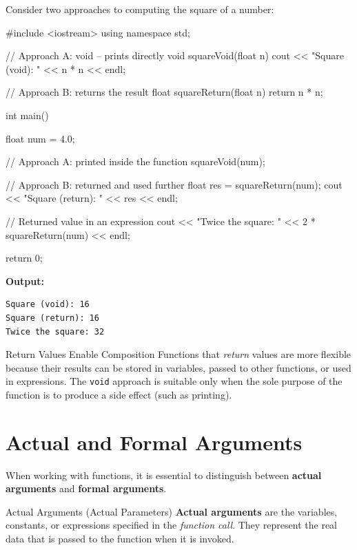 Consider two approaches to computing the square of a number:

\begin{cppcode}
#include <iostream>
using namespace std;

// Approach A: void -- prints directly
void squareVoid(float n)
{
    cout << "Square (void): " << n * n << endl;
}

// Approach B: returns the result
float squareReturn(float n)
{
    return n * n;
}

int main()
{
    float num = 4.0;

    // Approach A: printed inside the function
    squareVoid(num);

    // Approach B: returned and used further
    float res = squareReturn(num);
    cout << "Square (return): " << res << endl;

    // Returned value in an expression
    cout << "Twice the square: "
         << 2 * squareReturn(num) << endl;

    return 0;
}
\end{cppcode}

\noindent\textbf{Output:}
\begin{verbatim}
Square (void): 16
Square (return): 16
Twice the square: 32
\end{verbatim}

\begin{importantbox}{Return Values Enable Composition}
Functions that \emph{return} values are more flexible because their results
can be stored in variables, passed to other functions, or used in expressions.
The \texttt{void} approach is suitable only when the sole purpose of the
function is to produce a side effect (such as printing).
\end{importantbox}

\section{Actual and Formal Arguments}
\label{sec:actual-formal-args}

When working with functions, it is essential to distinguish between
\textbf{actual arguments} and \textbf{formal arguments}.

\begin{definitionbox}{Actual Arguments (Actual Parameters)}
\textbf{Actual arguments} are the variables, constants, or expressions
specified in the \emph{function call}. They represent the real data that is
passed to the function when it is invoked.
\end{definitionbox}

